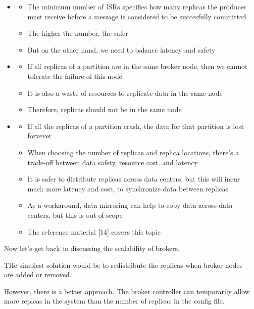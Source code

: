 \documentclass{report}
\theoremstyle{definition}
\begin{document}
\begin{itemize}
\item

\begin{itemize}
\item
The minimum number of ISRs specifies how many replicas the producer must receive before a message is considered to be succesfully committed
\item
The higher the number, the safer
\item
But on the other hand, we need to balance latency and safety
\end{itemize}

\item

\begin{itemize}
\item
If all replicas of a partition are in the same broker node, then we cannot tolerate the failure of this node
\item
It is also a waste of resources to replicate data in the same node
\item
Therefore, replicas should not be in the same node
\end{itemize}

\item

\begin{itemize}
\item
If all the replicas of a partition crash, the data for that partition is lost forvever
\item
When choosing the number of replicas and replica locations, there's a trade-off between data safety, resource cost, and latency
\item
It is safer to distribute replicas across data centers, but this will incur much more latency and cost, to synchronize data between replicas
\item
As a workaround, data mirroring can help to copy data across data centers, but this is out of scope
\item
The reference material [14] covers this topic
\end{itemize}
\end{itemize}

Now let's get back to discussing the scalability of brokers.

THe simplest solution would be to redistribute the replicas when broker nodes are added or removed.

However, there is a better approach. The broker controller can temporarily allow more replcas in the system than the number of replicas in the config file.
\end{document}
